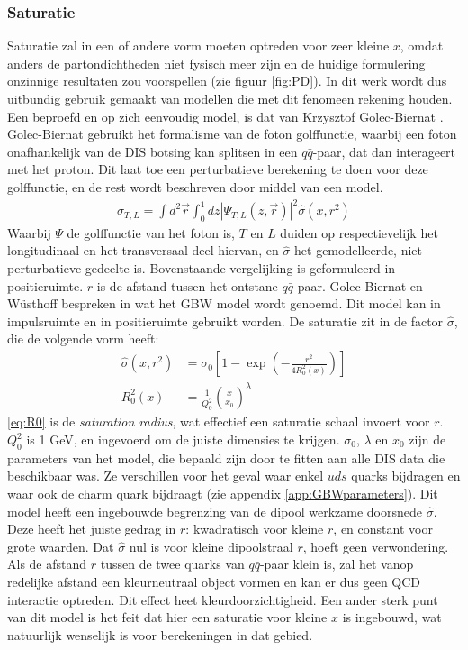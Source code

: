 \documentclass[a4paper,11pt]{article}
\numberwithin{equation}{section} %
\begin{document}
    \subsubsection{Saturatie} \label{sec:Saturatie}
Saturatie zal in een of andere vorm moeten optreden voor zeer kleine $x$, omdat anders de partondichtheden niet fysisch meer zijn en de huidige formulering onzinnige resultaten zou voorspellen (zie figuur \ref{fig:PD}).
In dit werk wordt dus uitbundig gebruik gemaakt van modellen die met dit fenomeen rekening houden.
Een beproefd en op zich eenvoudig model, is dat van Krzysztof Golec-Biernat \cite{GB}.
Golec-Biernat gebruikt het formalisme van de foton golffunctie, waarbij een foton onafhankelijk van de DIS botsing kan splitsen in een $q\bar{q}$-paar, dat dan interageert met het proton.
Dit laat toe een perturbatieve berekening te doen voor deze golffunctie, en de rest wordt beschreven door middel van een model.
\begin{align}
\sigma_{T,L} = \int d^2 \vec{r} \int_0^1 dz |\Psi_{T,L} (z, \vec{r})|^2 \hat{\sigma} (x,r^2)
\end{align}
Waarbij $\Psi$ de golffunctie van het foton is, $T$ en $L$ duiden op respectievelijk het longitudinaal en het transversaal deel hiervan, en $\hat{\sigma}$ het gemodelleerde, niet-perturbatieve gedeelte is.
Bovenstaande vergelijking is geformuleerd in positieruimte.
$r$ is de afstand tussen het ontstane $q\bar{q}$-paar.
Golec-Biernat en Wüsthoff bespreken in \cite{GBW} wat het GBW model wordt genoemd.
Dit model kan in impulsruimte en in positieruimte gebruikt worden.
De saturatie zit in de factor $\hat{\sigma}$, die de volgende vorm heeft:
\begin{align}
\hat{\sigma}(x,r^2) &= \sigma_0 \left[ 1- \exp{\left(-\frac{r^2}{4 R_0^2(x)}\right)} \right] \\
R_0^2(x) &= \frac{1}{Q_0^2} \left( \frac{x}{x_0} \right)^\lambda \label{eq:R0}
\end{align}
\eqref{eq:R0} is de \textit{saturation radius}, wat effectief een saturatie schaal invoert voor $r$.
$Q_0^2$ is 1 GeV, en ingevoerd om de juiste dimensies te krijgen.
$\sigma_0$, $\lambda$ en $x_0$ zijn de parameters van het model, die bepaald zijn door te fitten aan alle DIS data die beschikbaar was.
Ze verschillen voor het geval waar enkel $uds$ quarks bijdragen en waar ook de charm quark bijdraagt (zie appendix \ref{app:GBWparameters}).
Dit model heeft een ingebouwde begrenzing van de dipool werkzame doorsnede $\hat{\sigma}$.
Deze heeft het juiste gedrag in $r$: kwadratisch voor kleine $r$, en constant voor grote waarden.
Dat $\hat{\sigma}$ nul is voor kleine dipoolstraal $r$, hoeft geen verwondering.
Als de afstand $r$ tussen de twee quarks van $q\bar{q}$-paar klein is, zal het vanop redelijke afstand een kleurneutraal object vormen en kan er dus geen QCD interactie optreden.
Dit effect heet kleurdoorzichtigheid.
Een ander sterk punt van dit model is het feit dat hier een saturatie voor kleine $x$ is ingebouwd, wat natuurlijk wenselijk is voor berekeningen in dat gebied.
\end{document}
